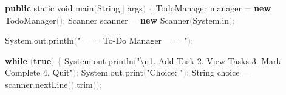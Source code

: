 \documentclass[
  justified,
  openright,
]{tufte-book}
\newcommand{\KeywordTok}[1]{\textcolor{CodeKeyword}{\textbf{#1}}}  %
\newcommand{\StringTok}[1]{\textcolor{CodeString}{#1}}              %
\newcommand{\CodeFuncTok}[1]{\textcolor{CodeKeyword}{#1}}           %
\newcommand{\CodeTypeTok}[1]{\textcolor{CodeType}{#1}}              %
\newcommand{\OperatorTok}[1]{\textcolor{DarkGray}{#1}}              %
\newenvironment{Shaded}{%
  \begin{mdframed}[style=TufteCode]%
}{%
  \end{mdframed}%
}
\begin{document}
\begin{Shaded}
\begin{Highlighting}[]
    \KeywordTok{public} \CodeTypeTok{static} \CodeTypeTok{void} \CodeFuncTok{main}\OperatorTok{(}String\OperatorTok{[]} args\OperatorTok{)} \OperatorTok{\{}
        TodoManager manager \OperatorTok{=} \KeywordTok{new} \CodeFuncTok{TodoManager}\OperatorTok{();}
        Scanner scanner \OperatorTok{=} \KeywordTok{new} Scanner\OperatorTok{(}System\OperatorTok{.}\CodeFuncTok{in}\OperatorTok{);}
 
        System\OperatorTok{.}\CodeFuncTok{out}\OperatorTok{.}\CodeFuncTok{println}\OperatorTok{(}\StringTok{"=== To{-}Do Manager ==="}\OperatorTok{);}
 
        \KeywordTok{while} \OperatorTok{(}\KeywordTok{true}\OperatorTok{)} \OperatorTok{\{}
            System\OperatorTok{.}\CodeFuncTok{out}\OperatorTok{.}\CodeFuncTok{println}\OperatorTok{(}\StringTok{"}\StringTok{\textbackslash{}n}\StringTok{1. Add Task  2. View Tasks  3. Mark Complete  4. Quit"}\OperatorTok{);}
            System\OperatorTok{.}\CodeFuncTok{out}\OperatorTok{.}\CodeFuncTok{print}\OperatorTok{(}\StringTok{"Choice: "}\OperatorTok{);}
            String choice \OperatorTok{=} scanner\OperatorTok{.}\CodeFuncTok{nextLine}\OperatorTok{().}\CodeFuncTok{trim}\OperatorTok{();}
 

\end{Highlighting}
\end{Shaded}
\end{document}
